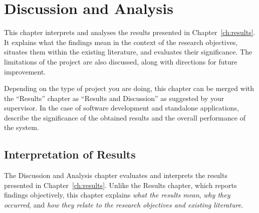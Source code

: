 
\chapter{Discussion and Analysis}
\label{ch:evaluation}

This chapter interprets and analyses the results presented in 
Chapter~\ref{ch:results}. It explains what the findings mean in the context 
of the research objectives, situates them within the existing literature, 
and evaluates their significance. The limitations of the project are also 
discussed, along with directions for future improvement.

\noindent Depending on the type of project you are doing, this chapter can be 
merged with the ``Results'' chapter as ``Results and Discussion'' as suggested 
by your supervisor. In the case of software development and standalone 
applications, describe the significance of the obtained results and the overall 
performance of the system.

\section{Interpretation of Results}
\label{sec:interpretation}

The Discussion and Analysis chapter evaluates and interprets the results 
presented in Chapter~\ref{ch:results}. Unlike the Results chapter, which reports
findings objectively, this chapter explains \textit{what the results mean}, 
\textit{why they occurred}, and \textit{how they relate to the research 
objectives and existing literature}.

